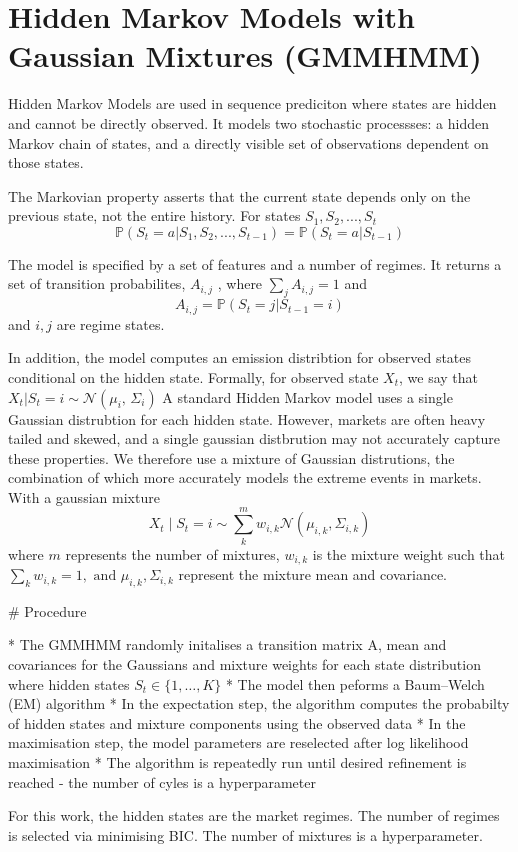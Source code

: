 \section{Hidden Markov Models with Gaussian Mixtures (GMMHMM)}

Hidden Markov Models are used in sequence prediciton where states are hidden and cannot be directly observed. 
It models two stochastic processses: a hidden Markov chain of states, and a directly visible set of observations dependent on those states.

The Markovian property asserts that the current state depends only on the previous state, not the entire history. For states $ S_1, S_2, ... , S_t $
\[ \mathbb{P}(S_t = a | S_1,S_2,..., S_{t-1}) = \mathbb{P}(S_t = a |S_{t-1}) \]

The model is specified by a set of features and a number of regimes.
It returns a set of transition probabilites, $ A_{i,j}$ , where $ \sum_j A_{i,j} = 1$ and \[ A_{i,j} = \mathbb{P}(S_{t} = j | S_{t-1} = i)\] and $i,j$ are regime states.

In addition, the model computes an emission distribtion for observed states conditional on the hidden state. Formally, for observed state $X_t$, we say that  $ X_t | S_t = i \sim \mathcal{N}(\mu_i,\,\Sigma_i)$ A standard Hidden Markov model uses a single Gaussian distrubtion for each hidden state. However, markets are often heavy tailed and skewed, and a single gaussian distbrution may not accurately capture these properties. We therefore use a mixture of Gaussian distrutions, the combination of which more accurately models the extreme events in markets. With a gaussian mixture $$ X_t \mid S_t = i \sim \sum_k^{m} w_{i,k} \mathcal{N}(\mu_{i,k}, \Sigma_{i,k}) $$ where $m$ represents the number of mixtures, $w_{i,k}$ is the mixture weight such that $\sum_{k} w_{i,k} = 1, \text{ and } \mu_{i,k}, \Sigma_{i,k}$ represent the mixture mean and covariance.

# Procedure

* The GMMHMM randomly initalises a transition matrix A, mean and covariances for the Gaussians and mixture weights for each state distribution  where hidden states $S_t \in \{1, \dots, K\}$
* The model then peforms a Baum–Welch (EM) algorithm 
* In the expectation step, the algorithm computes the probabilty of hidden states and mixture components using the observed data
* In the maximisation step, the model parameters are reselected after log likelihood maximisation
* The algorithm is repeatedly run until desired refinement is reached - the number of cyles is a hyperparameter


For this work, the hidden states are the market regimes. 
The number of regimes is selected via minimising BIC. The number of mixtures is a hyperparameter.
